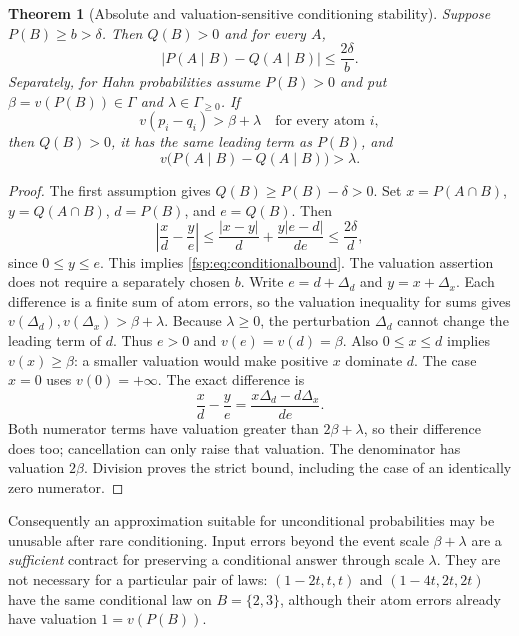 \documentclass[11pt,a4paper]{article}
\numberwithin{equation}{section}
\newtheorem{theorem}{Theorem}[section]
\theoremstyle{definition}
\theoremstyle{remark}
\begin{document}
\begin{theorem}[Absolute and valuation-sensitive conditioning stability]
\label{fsp:thm:stability}
Suppose $P(B)\ge b>\delta$. Then $Q(B)>0$ and for every $A$,
\begin{equation}\label{fsp:eq:conditionalbound}
 |P(A\mid B)-Q(A\mid B)|\le\frac{2\delta}{b}.
\end{equation}
Separately, for Hahn probabilities assume $P(B)>0$ and put
$\beta=v(P(B))\in\Gamma$ and $\lambda\in\Gamma_{\ge0}$.
If
\begin{equation}\label{fsp:eq:precision}
 v(p_i-q_i)>\beta+\lambda\quad\text{for every atom }i,
\end{equation}
then $Q(B)>0$, it has the same leading term as $P(B)$, and
\begin{equation}
 v\bigl(P(A\mid B)-Q(A\mid B)\bigr)>\lambda.
\end{equation}
\end{theorem}
\begin{proof}
The first assumption gives $Q(B)\ge P(B)-\delta>0$.
Set $x=P(A\cap B)$, $y=Q(A\cap B)$, $d=P(B)$, and $e=Q(B)$.
Then
\begin{equation}
 \left|\frac{x}{d}-\frac{y}{e}\right|
 \le\frac{|x-y|}{d}+\frac{y|e-d|}{de}
 \le\frac{2\delta}{d},
\end{equation}
since $0\le y\le e$. This implies \eqref{fsp:eq:conditionalbound}.
The valuation assertion does not require a separately chosen $b$.
Write $e=d+\Delta_d$ and $y=x+\Delta_x$. Each difference is a finite
sum of atom errors, so the valuation inequality for sums gives
$v(\Delta_d),v(\Delta_x)>\beta+\lambda$. Because $\lambda\ge0$,
the perturbation $\Delta_d$ cannot change the leading term of $d$.
Thus $e>0$ and $v(e)=v(d)=\beta$.
Also $0\le x\le d$ implies $v(x)\ge\beta$: a smaller valuation
would make positive $x$ dominate $d$. The case $x=0$ uses $v(0)=+\infty$.
The exact difference is
\[
 \frac{x}{d}-\frac{y}{e}
 =\frac{x\Delta_d-d\Delta_x}{de}.
\]
Both numerator terms have valuation greater than $2\beta+\lambda$,
so their difference does too; cancellation can only raise that valuation.
The denominator has valuation $2\beta$. Division proves the strict
bound, including the case of an identically zero numerator.
\end{proof}

Consequently an approximation suitable for unconditional probabilities
may be unusable after rare conditioning. Input errors beyond the event scale $\beta+\lambda$ are a
\emph{sufficient} contract for preserving a conditional answer through
scale $\lambda$. They are not necessary for a particular pair of laws:
$(1-2t,t,t)$ and $(1-4t,2t,2t)$ have the same conditional law on
$B=\{2,3\}$, although their atom errors already have valuation $1=v(P(B))$.
\end{document}
